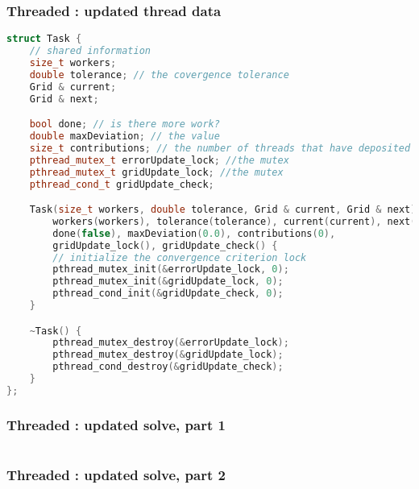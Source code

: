 \begin{frame}[fragile]
% 
  \frametitle{Threaded : updated thread data}
%
  \begin{lstlisting}[language=c++,name=Jacobi:updated-threaded,basicstyle=\tt\bfseries\tiny]
struct Task {
    // shared information 
    size_t workers;
    double tolerance; // the covergence tolerance
    Grid & current;
    Grid & next;

    bool done; // is there more work?
    double maxDeviation; // the value
    size_t contributions; // the number of threads that have deposited contributions
    pthread_mutex_t errorUpdate_lock; //the mutex
    pthread_mutex_t gridUpdate_lock; //the mutex
    pthread_cond_t gridUpdate_check;

    Task(size_t workers, double tolerance, Grid & current, Grid & next) :
        workers(workers), tolerance(tolerance), current(current), next(next),
        done(false), maxDeviation(0.0), contributions(0),
        gridUpdate_lock(), gridUpdate_check() {
        // initialize the convergence criterion lock
        pthread_mutex_init(&errorUpdate_lock, 0);
        pthread_mutex_init(&gridUpdate_lock, 0);
        pthread_cond_init(&gridUpdate_check, 0);
    }

    ~Task() {
        pthread_mutex_destroy(&errorUpdate_lock);
        pthread_mutex_destroy(&gridUpdate_lock);
        pthread_cond_destroy(&gridUpdate_check);
    }
};

  \end{lstlisting}
%
\end{frame}

\begin{frame}[fragile]
% 
  \frametitle{Threaded : updated solve, part 1}
%
  \begin{lstlisting}[language=c++,name=Jacobi:updated-solve,basicstyle=\tt\bfseries\tiny]
  \end{lstlisting}
%
\end{frame}

\begin{frame}[fragile]
% 
  \frametitle{Threaded : updated solve, part 2}
%
  \begin{lstlisting}[language=c++,name=Jacobi:updated-solve,basicstyle=\tt\bfseries\tiny]
  \end{lstlisting}
%
\end{frame}

